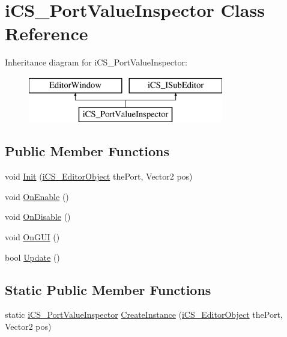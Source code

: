 \hypertarget{classi_c_s___port_value_inspector}{\section{i\+C\+S\+\_\+\+Port\+Value\+Inspector Class Reference}
\label{classi_c_s___port_value_inspector}
}
Inheritance diagram for i\+C\+S\+\_\+\+Port\+Value\+Inspector\+:\begin{figure}[H]
\begin{center}
\leavevmode
\includegraphics[height=2.000000cm]{classi_c_s___port_value_inspector}
\end{center}
\end{figure}
\subsection*{Public Member Functions}
\begin{DoxyCompactItemize}
\item 
void \hyperlink{classi_c_s___port_value_inspector_a20f61036c44e97f052d7f9a3185a5360}{Init} (\hyperlink{classi_c_s___editor_object}{i\+C\+S\+\_\+\+Editor\+Object} the\+Port, Vector2 pos)
\item 
void \hyperlink{classi_c_s___port_value_inspector_af1ac0745f47f3eb3c4993e458734454d}{On\+Enable} ()
\item 
void \hyperlink{classi_c_s___port_value_inspector_acbcf8258b8524598fa72a5c9ce8fb843}{On\+Disable} ()
\item 
void \hyperlink{classi_c_s___port_value_inspector_a5fbcc87f763d1072187f399cb71f2d0e}{On\+G\+U\+I} ()
\item 
bool \hyperlink{classi_c_s___port_value_inspector_a7f44fe661315dfe215a16afa1d7f1700}{Update} ()
\end{DoxyCompactItemize}
\subsection*{Static Public Member Functions}
\begin{DoxyCompactItemize}
\item 
static \hyperlink{classi_c_s___port_value_inspector}{i\+C\+S\+\_\+\+Port\+Value\+Inspector} \hyperlink{classi_c_s___port_value_inspector_ae16f6c23a059996a16886ef656475026}{Create\+Instance} (\hyperlink{classi_c_s___editor_object}{i\+C\+S\+\_\+\+Editor\+Object} the\+Port, Vector2 pos)
\end{DoxyCompactItemize}


